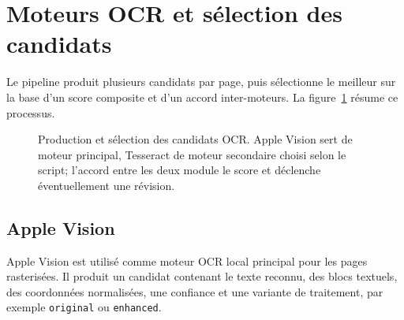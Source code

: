 \documentclass[11pt,a4paper]{article}
\begin{document}
\section{Moteurs OCR et sélection des candidats}

Le pipeline produit plusieurs candidats par page, puis sélectionne le meilleur sur la base d'un score composite et d'un accord inter-moteurs. La figure~\ref{fig:ocr} résume ce processus.

\begin{figure}[H]
\centering
{}
\caption{Production et sélection des candidats OCR. Apple Vision sert de moteur principal, Tesseract de moteur secondaire choisi selon le script; l'accord entre les deux module le score et déclenche éventuellement une révision.}
\label{fig:ocr}
\end{figure}

\subsection{Apple Vision}

Apple Vision est utilisé comme moteur OCR local principal pour les pages rasterisées. Il produit un candidat contenant le texte reconnu, des blocs textuels, des coordonnées normalisées, une confiance et une variante de traitement, par exemple \texttt{original} ou \texttt{enhanced}.
\end{document}
